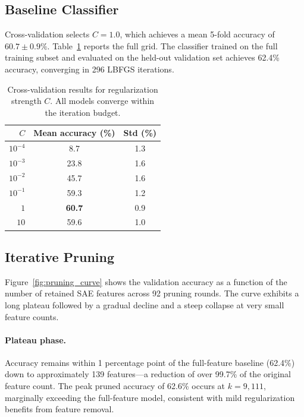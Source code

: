 \subsection{Baseline Classifier}
\label{sec:baseline_results}

Cross-validation selects $C = 1.0$, which achieves a mean 5-fold accuracy of $60.7 \pm 0.9\%$. Table~\ref{tab:cv} reports the full grid. The classifier trained on the full training subset and evaluated on the held-out validation set achieves 62.4\% accuracy, converging in 296 LBFGS iterations.

\begin{table}[t]
\centering
\caption{Cross-validation results for regularization strength $C$. All models converge within the iteration budget.}
\label{tab:cv}
\begin{tabular}{rcc}
\toprule
$C$ & Mean accuracy (\%) & Std (\%) \\
\midrule
$10^{-4}$ & 8.7 & 1.3 \\
$10^{-3}$ & 23.8 & 1.6 \\
$10^{-2}$ & 45.7 & 1.6 \\
$10^{-1}$ & 59.3 & 1.2 \\
$1$        & \textbf{60.7} & 0.9 \\
$10$       & 59.6 & 1.0 \\
\bottomrule
\end{tabular}
\end{table}

\subsection{Iterative Pruning}
\label{sec:pruning_results}

Figure~\ref{fig:pruning_curve} shows the validation accuracy as a function of the number of retained SAE features across 92 pruning rounds. The curve exhibits a long plateau followed by a gradual decline and a steep collapse at very small feature counts.

\paragraph{Plateau phase.}
Accuracy remains within 1 percentage point of the full-feature baseline (62.4\%) down to approximately 139 features---a reduction of over 99.7\% of the original feature count. The peak pruned accuracy of 62.6\% occurs at $k = 9{,}111$, marginally exceeding the full-feature model, consistent with mild regularization benefits from feature removal.

